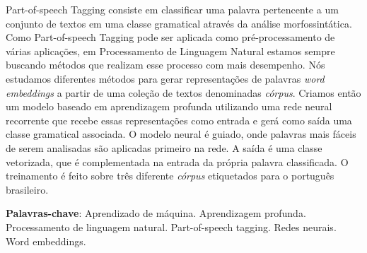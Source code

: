 \begin{resumo}
 
Part-of-speech Tagging consiste em classificar uma palavra pertencente a um conjunto de textos em uma classe gramatical através da análise morfossintática. Como Part-of-speech Tagging pode ser aplicada como pré-processamento de várias aplicações, em Processamento de Linguagem Natural estamos sempre buscando métodos que realizam esse processo com mais desempenho. Nós estudamos diferentes métodos para gerar representações de palavras \textit{word embeddings} a partir de uma coleção de textos denominadas \textit{córpus}. Criamos então um modelo baseado em aprendizagem profunda utilizando uma rede neural recorrente que recebe essas representações como entrada e gerá como saída uma classe gramatical associada. O modelo neural é guiado, onde palavras mais fáceis de serem analisadas são aplicadas primeiro na rede. A saída é uma classe vetorizada, que é complementada na entrada da própria palavra classificada. O treinamento é feito sobre três diferente \textit{córpus} etiquetados para o português brasileiro.

 \vspace{\onelineskip}
    
 \noindent
 \textbf{Palavras-chave}: Aprendizado de máquina. Aprendizagem profunda. Processamento de linguagem natural. Part-of-speech tagging. Redes neurais. Word embeddings.
\end{resumo}
